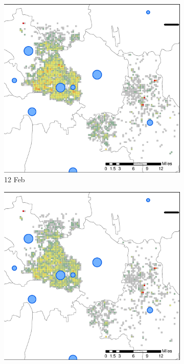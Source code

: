 \documentclass[preprints,ijgi,submit,moreauthors]{Definitions/mdpi}
\begin{document}
\begin{figure}[H]
    \centering
    \begin{subfigure}{.3\textwidth}
        \includegraphics[width=\textwidth]{Figures/Figure7/NewDistrictSSBD2020_02_12.eps}
        \caption{12 Feb}
    \end{subfigure}
    \begin{subfigure}{.3\textwidth}
        \includegraphics[width=\textwidth]{Figures/Figure7/NewDistrictSSBD2020_02_16.eps}

\end{subfigure}
\end{figure}
\end{document}
